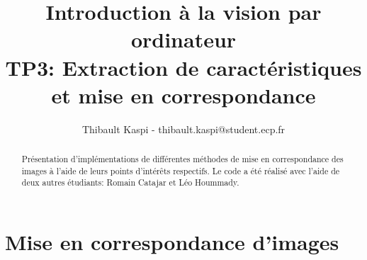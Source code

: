 \documentclass{article}
\begin{document}
\title{Introduction à la vision par ordinateur \\
TP3: Extraction de caractéristiques \\et mise
en correspondance}
\author{Thibault Kaspi - thibault.kaspi@student.ecp.fr}
\maketitle

\begin{abstract}
Présentation d'implémentations de différentes méthodes de mise en correspondance des images à l’aide de leurs points d’intérêts respectifs. Le code a été réalisé avec l'aide de deux autres étudiants: Romain Catajar et Léo Hoummady.
\end{abstract}

\section{Mise en correspondance d'images}
\end{document}

